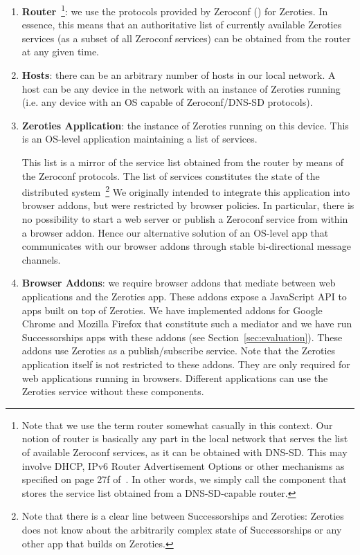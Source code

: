 \begin{enumerate}
\item \textbf{Router}~\footnote{Note that we use the term router somewhat casually in this context. Our notion of router is basically any part in the local network that serves the list of available Zeroconf services, as it can be obtained with DNS-SD. This may involve DHCP, IPv6 Router Advertisement Options or other mechanisms as specified on page 27f of~\cite{cheshire_2013_dnssd}. In other words, we simply call the component that stores the service list obtained from a DNS-SD-capable router.}: we use the protocols provided by Zeroconf (\cite{cheshire_2013_dnssd, cheshire_2013_mdns}) for Zeroties. 
In essence, this means that an authoritative list of currently available Zeroties services (as a subset of all Zeroconf services) can be obtained from the router at any given time.

\item \textbf{Hosts}: there can be an arbitrary number of hosts in our local network. A host can be any device in the network with an instance of Zeroties running (i.e. any device with an OS capable of Zeroconf/DNS-SD protocols).

\item \textbf{Zeroties Application}: the instance of Zeroties running on this device. 
This is an OS-level application maintaining a list of services.

This list is a mirror of the service list obtained from the router by means of the Zeroconf protocols. 
The list of services constitutes the state of the distributed system~\footnote{Note that there is a clear line between Successorships and Zeroties: Zeroties does not know about the arbitrarily complex state of Successorships or any other app that builds on Zeroties.}
We originally intended to integrate this application into browser addons, but were restricted by browser policies.
In particular, there is no possibility to start a web server or publish a Zeroconf service from within a browser addon.
Hence our alternative solution of an OS-level app that communicates with our browser addons through stable bi-directional message channels.

\item \textbf{Browser Addons}: we require browser addons that mediate between web applications and the Zeroties app. These addons expose a JavaScript API to apps built on top of Zeroties.
We have implemented addons for Google Chrome and Mozilla Firefox that constitute such a mediator and we have run Successorships apps with these addons (see Section~\ref{sec:evaluation}).
These addons use Zeroties as a publish/subscribe service.
Note that the Zeroties application itself is not restricted to these addons.
They are only required for web applications running in browsers.
Different applications can use the Zeroties service without these components.


\end{enumerate}
